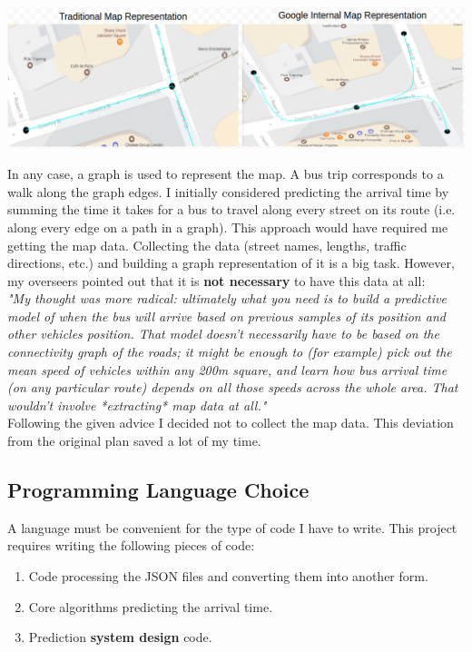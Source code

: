 \documentclass[12pt,a4paper,oneside,openright]{report}
\begin{document}
\includegraphics[width=\textwidth]{figs/google.png}

In any case, a graph is used to represent the map. A bus trip corresponds to a walk
along the graph edges. I initially considered predicting the arrival time by summing the
time it takes for a bus to travel along every street on its route (i.e. along every edge on
a path in a graph). This approach would have required
me getting the map data. Collecting the data (street names, lengths, traffic directions, etc.)
and building a graph representation of it is a big task. However, my overseers pointed out
that it is \textbf{not necessary} to have this data at all: \\

\textit{"My thought was more radical: ultimately what you need is to build a predictive
 model of when the bus will arrive based on previous samples of its position and other
 vehicles position. That model doesn't necessarily have to be based on the connectivity
 graph of the roads; it might be enough to (for example) pick out the mean speed of
 vehicles within any 200m square, and learn how bus arrival time (on any particular route)
 depends on all those speeds across the whole area. That wouldn't involve *extracting* map
 data at all."} \\

Following the given advice I decided not to collect the map data. This deviation from the
original plan saved a lot of my time.

\subsection{Programming Language Choice}

A language must be convenient for the type of code I have to write. This project requires writing
the following pieces of code:

\begin{enumerate}
\item Code processing the JSON files and converting them into another form.
\item Core algorithms predicting the arrival time.
\item Prediction \textbf{system design} code.
\end{enumerate}
\end{document}
